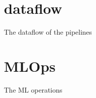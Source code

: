 \documentclass{article}
\begin{document}
\citet{kour2014real}

\cite{vidal03:_learn_multiag_system}

\cite{wong21:_deep_multiag_reinf_learn}

\begin{appendices}
\section{dataflow}
The dataflow of the pipelines
\section{MLOps}
The ML operations
\end{appendices}
%





\end{document}
